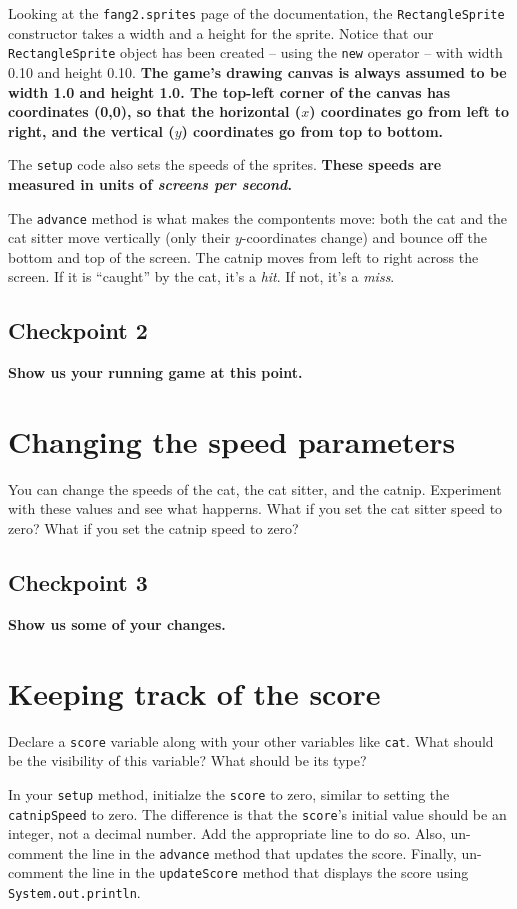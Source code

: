 \documentclass[12pt]{article}
\newcommand{\fname}[1]{\texttt{#1}}
\newcommand{\code}[1]{\texttt{#1}}
\begin{document}
Looking at the \fname{fang2.sprites} page of the documentation, the
\code{RectangleSprite} constructor takes a width and a height for the
sprite.  Notice that our \code{RectangleSprite} object
has been created -- using the \code{new} operator --
with width 0.10 and height 0.10.
{\bf The game's drawing canvas is always assumed
to be width 1.0 and height 1.0.
The top-left corner of the canvas has coordinates (0,0),
so that the horizontal ($x$) coordinates go from left to right,
and the vertical ($y$) coordinates go from top to bottom.}

The \code{setup} code also sets the speeds of the sprites.
{\bf These speeds are measured in units of {\em screens per second}.}

The \code{advance} method is what makes the compontents move:
both the cat and the cat sitter move vertically
(only their $y$-coordinates change)
and bounce off the bottom and top of the screen.
The catnip moves from left to right across the screen.
If it is ``caught'' by the cat, it's a {\em hit}.
If not, it's a {\em miss}.

\subsection*{Checkpoint 2}
{\bf Show us your running game at this point.}

\section*{Changing the speed parameters}
You can change the speeds of the cat, the cat sitter, and the catnip.
Experiment with these values and see what happerns.
What if you set the cat sitter speed to zero?
What if you set the catnip speed to zero?

\subsection*{Checkpoint 3}
{\bf Show us some of your changes.}

\section*{Keeping track of the score}

Declare a \code{score} variable along with your other variables
like \code{cat}.
What should be the visibility of this variable?
What should be its type?

In your \code{setup} method,
initialze the \code{score} to zero,
similar to setting the \code{catnipSpeed} to zero.
The difference is that the \code{score}'s initial value
should be an integer, not a decimal number.
Add the appropriate line to do so.
Also, un-comment the line in the \code{advance} method
that updates the score.
Finally, un-comment the line in the \code{updateScore} method
that displays the score using \code{System.out.println}.
\end{document}
